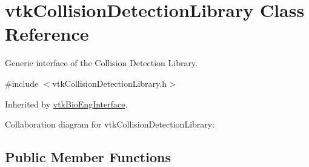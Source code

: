 \hypertarget{classvtkCollisionDetectionLibrary}{
\section{vtkCollisionDetectionLibrary Class Reference}
\label{classvtkCollisionDetectionLibrary}
}


Generic interface of the Collision Detection Library.  




{\ttfamily \#include $<$vtkCollisionDetectionLibrary.h$>$}



Inherited by \hyperlink{classvtkBioEngInterface}{vtkBioEngInterface}.



Collaboration diagram for vtkCollisionDetectionLibrary:\subsection*{Public Member Functions}
